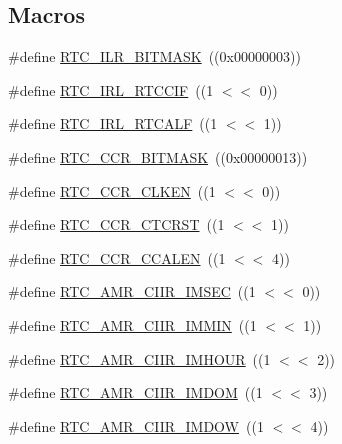 \subsection*{Macros}
\begin{DoxyCompactItemize}
\item 
\#define \hyperlink{group___r_t_c__17_x_x__40_x_x_ga9c00baff0fca4f8e747fadfe9ee12775}{R\+T\+C\+\_\+\+I\+L\+R\+\_\+\+B\+I\+T\+M\+A\+S\+K}~((0x00000003))
\item 
\#define \hyperlink{group___r_t_c__17_x_x__40_x_x_gaf706fff68e830a082d476467fe71f297}{R\+T\+C\+\_\+\+I\+R\+L\+\_\+\+R\+T\+C\+C\+I\+F}~((1 $<$$<$ 0))
\item 
\#define \hyperlink{group___r_t_c__17_x_x__40_x_x_ga237351d2c7f08b447254eff9578eb11e}{R\+T\+C\+\_\+\+I\+R\+L\+\_\+\+R\+T\+C\+A\+L\+F}~((1 $<$$<$ 1))
\item 
\#define \hyperlink{group___r_t_c__17_x_x__40_x_x_gadc461b6f544d66841e09499b2b9734c7}{R\+T\+C\+\_\+\+C\+C\+R\+\_\+\+B\+I\+T\+M\+A\+S\+K}~((0x00000013))
\item 
\#define \hyperlink{group___r_t_c__17_x_x__40_x_x_gad08af035635f5acd7931cb982f95e771}{R\+T\+C\+\_\+\+C\+C\+R\+\_\+\+C\+L\+K\+E\+N}~((1 $<$$<$ 0))
\item 
\#define \hyperlink{group___r_t_c__17_x_x__40_x_x_ga70900054432c82dad7d63d4598502923}{R\+T\+C\+\_\+\+C\+C\+R\+\_\+\+C\+T\+C\+R\+S\+T}~((1 $<$$<$ 1))
\item 
\#define \hyperlink{group___r_t_c__17_x_x__40_x_x_gaeb77b2340d896fae77ea670bb70e972e}{R\+T\+C\+\_\+\+C\+C\+R\+\_\+\+C\+C\+A\+L\+E\+N}~((1 $<$$<$ 4))
\item 
\#define \hyperlink{group___r_t_c__17_x_x__40_x_x_ga30c785b6017020d4c0b61b22aff30aac}{R\+T\+C\+\_\+\+A\+M\+R\+\_\+\+C\+I\+I\+R\+\_\+\+I\+M\+S\+E\+C}~((1 $<$$<$ 0))
\item 
\#define \hyperlink{group___r_t_c__17_x_x__40_x_x_ga3d67e7c72ec7bcd0831628841496cbc6}{R\+T\+C\+\_\+\+A\+M\+R\+\_\+\+C\+I\+I\+R\+\_\+\+I\+M\+M\+I\+N}~((1 $<$$<$ 1))
\item 
\#define \hyperlink{group___r_t_c__17_x_x__40_x_x_ga4e20983ef05abf10773186d3193270f9}{R\+T\+C\+\_\+\+A\+M\+R\+\_\+\+C\+I\+I\+R\+\_\+\+I\+M\+H\+O\+U\+R}~((1 $<$$<$ 2))
\item 
\#define \hyperlink{group___r_t_c__17_x_x__40_x_x_gacd23cffe1367b6bb612fb37ebdf2e279}{R\+T\+C\+\_\+\+A\+M\+R\+\_\+\+C\+I\+I\+R\+\_\+\+I\+M\+D\+O\+M}~((1 $<$$<$ 3))
\item 
\#define \hyperlink{group___r_t_c__17_x_x__40_x_x_ga6494d5878d87398a4519e90a367bffe5}{R\+T\+C\+\_\+\+A\+M\+R\+\_\+\+C\+I\+I\+R\+\_\+\+I\+M\+D\+O\+W}~((1 $<$$<$ 4))

\end{DoxyCompactItemize}
